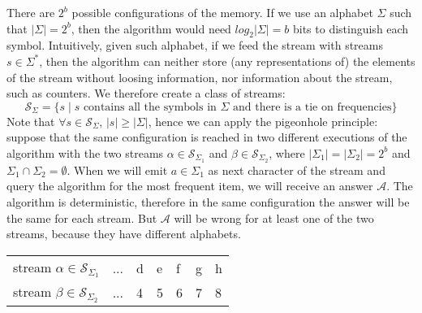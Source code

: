 There are $2^b$ possible configurations of the memory. If we use an alphabet $\Sigma$ such that $|\Sigma|=2^b$, then the algorithm would need $log_2|\Sigma| = b$ bits to distinguish each symbol. Intuitively, given such alphabet, if we feed the stream with streams $s\in\Sigma^*$, then the algorithm can neither store (any representations of) the elements of the stream without loosing information, nor information about the stream, such as counters. We therefore create a class of streams:
$$\mathcal{S}_\Sigma = \{s \mid s \text{ contains all the symbols in } \Sigma \text{ and there is a tie on frequencies} \}$$
Note that $\forall s \in \mathcal{S}_\Sigma$, $|s|\geq|\Sigma|$, hence we can apply the pigeonhole principle:
suppose that the same configuration is reached in two different executions of the algorithm with the two streams $\alpha \in \mathcal{S}_{\Sigma_1}$ and $\beta \in \mathcal{S}_{\Sigma_2}$, where $|\Sigma_1|=|\Sigma_2|=2^b$ and $\Sigma_1 \cap \Sigma_2 = \emptyset$.
When we will emit $a \in \Sigma_1$ as next character of the stream and query the algorithm for the most frequent item, we will receive an answer $\mathcal{A}$. The algorithm is deterministic, therefore in the same configuration the answer will be the same for each stream. But $\mathcal{A}$ will be wrong for at least one of the two streams, because they have different alphabets.


\begin{table}[h]
  \centering
  \begin{tabular}{l|l|l|l|l|l|l|}
    \cline{2-7}
    stream $\alpha \in \mathcal{S}_{\Sigma_1}$ & ... & d & e & f & g & h \\ \cline{2-7} 
    stream $\beta \in \mathcal{S}_{\Sigma_2}$ & ... & 4 & 5 & 6 & 7 & 8 \\ \cline{2-7} 
  \end{tabular}
\end{table}
